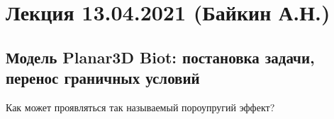 \documentclass[main.tex]{subfiles}
\begin{document}

\section{Лекция 13.04.2021 (Байкин А.Н.)}

\subsection{Модель Planar3D Biot: постановка задачи, перенос граничных условий}

Как может проявляться так называемый пороупругий эффект?
\end{document}
